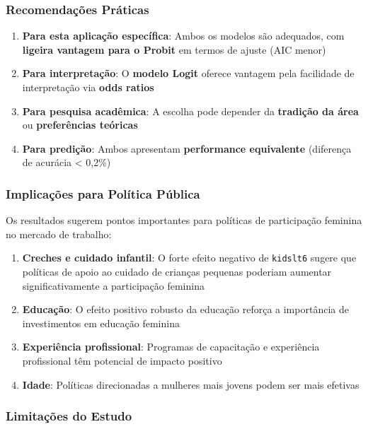 \documentclass[
  letterpaper,
  DIV=11,
  numbers=noendperiod]{scrartcl}
\begin{document}
\subsubsection{Recomendações
Práticas}\label{recomendauxe7uxf5es-pruxe1ticas}

\begin{enumerate}
\def\labelenumi{\arabic{enumi}.}
\item
  \textbf{Para esta aplicação específica}: Ambos os modelos são
  adequados, com \textbf{ligeira vantagem para o Probit} em termos de
  ajuste (AIC menor)
\item
  \textbf{Para interpretação}: O \textbf{modelo Logit} oferece vantagem
  pela facilidade de interpretação via \textbf{odds ratios}
\item
  \textbf{Para pesquisa acadêmica}: A escolha pode depender da
  \textbf{tradição da área} ou \textbf{preferências teóricas}
\item
  \textbf{Para predição}: Ambos apresentam \textbf{performance
  equivalente} (diferença de acurácia \textless{} 0,2\%)
\end{enumerate}

\subsubsection{Implicações para Política
Pública}\label{implicauxe7uxf5es-para-poluxedtica-puxfablica}

Os resultados sugerem pontos importantes para políticas de participação
feminina no mercado de trabalho:

\begin{enumerate}
\def\labelenumi{\arabic{enumi}.}
\item
  \textbf{Creches e cuidado infantil}: O forte efeito negativo de
  \texttt{kidslt6} sugere que políticas de apoio ao cuidado de crianças
  pequenas poderiam aumentar significativamente a participação feminina
\item
  \textbf{Educação}: O efeito positivo robusto da educação reforça a
  importância de investimentos em educação feminina
\item
  \textbf{Experiência profissional}: Programas de capacitação e
  experiência profissional têm potencial de impacto positivo
\item
  \textbf{Idade}: Políticas direcionadas a mulheres mais jovens podem
  ser mais efetivas
\end{enumerate}

\subsubsection{Limitações do Estudo}\label{limitauxe7uxf5es-do-estudo}
\end{document}
